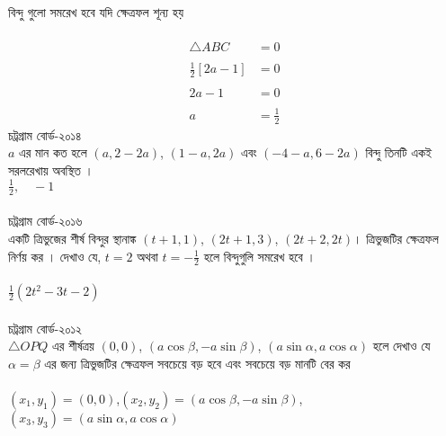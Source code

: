 \documentclass{article}
\begin{document}
\\
বিন্দু গুলো সমরেখ হবে যদি ক্ষেত্রফল শূন্য হয় \\
\\
\begin{align*}
	\triangle ABC	&=0\\
	\\
	\frac{1}{2}\left[2a-1\right]&=0\\
	\\
	2a-1&=0\\
	\\
	a&=\frac{1}{2}
\end{align*}
 চট্রগ্রাম বোর্ড-২০১৪\\ 
  $a$ এর মান কত হলে $(a,2-2a)$, $(1-a,2a)$ এবং $(-4-a,6-2a)$  বিন্দু তিনটি একই সরলরেখায় অবস্থিত । \\
   $\frac{1}{2},\quad -1$\\
   \\ 
   চট্রগ্রাম বোর্ড-২০১৬\\ 
   একটি ত্রিভুজের শীর্ষ বিন্দুর স্থানাঙ্ক $(t+1,1)$, $(2t+1,3)$, $(2t+2,2t)$। ত্রিভুজটির ক্ষেত্রফল নির্ণয় কর । দেখাও যে, $t=2$ অথবা $t=-\frac{1}{2}$ হলে বিন্দুগুলি সমরেখ হবে । \\
   \\
   $\frac{1}{2}(2t^2-3t-2)$\\ 
   \\
     চট্রগ্রাম বোর্ড-২০১২\\ 
   $\triangle OPQ$ এর শীর্ষত্রয়  $(0,0)$,  $(a\cos \beta, -a\sin \beta)$,  $(a\sin \alpha, a\cos \alpha)$ হলে দেখাও যে  $\alpha =\beta $ এর জন্য ত্রিভুজটির ক্ষেত্রফল সবচেয়ে বড় হবে এবং সবচেয়ে বড় মানটি বের কর \\
   \\
     $(x_1,y_1)=(0,0)$,\quad $(x_2,y_2)=(a\cos \beta, -a\sin \beta)$,\quad $(x_3,y_3)=(a\sin \alpha, a\cos \alpha)$\\
   \\ 
\end{document}
